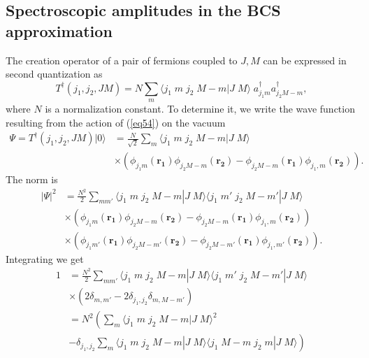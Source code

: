 \begin{subappendices}
\section{Spectroscopic amplitudes in the BCS approximation}\label{C7AppN}
The creation operator of a pair of fermions coupled to $J,M$ can be expressed in second quantization as
\begin{equation}\label{eq54}
T^\dagger(j_1,j_2,J M)=N\sum_m \langle j_1 \; m \;j_2 \;M-m|J \; M\rangle \;a^\dagger_{j_1m}a^\dagger_{j_2M-m},
\end{equation}
where $N$ is a normalization constant. To determine it, we write the wave function resulting from the action of (\ref{eq54}) on the vacuum
\begin{equation}\label{eq55}
\begin{split}
  \Psi=T^\dagger(j_1,j_2,J M) |0\rangle &= \frac{N}{\sqrt 2}\sum_m \langle j_1 \; m \;j_2 \;M-m|J \; M\rangle\\
    & \times\left(\phi_{j_1 m}(\mathbf{r_1})\phi_{j_2 M-m}(\mathbf{r_2})-\phi_{j_2 M-m}(\mathbf{r_1})\phi_{j_1,m}(\mathbf{r_2})\right).
\end{split}
\end{equation}
 The norm is
 \begin{equation}\label{eq56}
\begin{split}
  |\Psi|^2&= \frac{N^2}{2}\sum_{mm'} \langle j_1 \; m \;j_2 \;M-m|J \; M\rangle \langle j_1 \; m' \;j_2 \;M-m'|J \; M\rangle\\
    & \times \left(\phi_{j_1 m}(\mathbf{r_1})\phi_{j_2 M-m}(\mathbf{r_2})-\phi_{j_2 M-m}(\mathbf{r_1})\phi_{j_1,m}(\mathbf{r_2})\right)\\
    &\times \left(\phi_{j_1 m'}(\mathbf{r_1})\phi_{j_2 M-m'}(\mathbf{r_2})-\phi_{j_2 M-m'}(\mathbf{r_1})\phi_{j_1,m'}(\mathbf{r_2})\right).
\end{split}
\end{equation}
Integrating we get
 \begin{equation}\label{eq57}
\begin{split}
  1&= \frac{N^2}{2}\sum_{mm'} \langle j_1 \; m \;j_2 \;M-m|J \; M\rangle \langle j_1 \; m' \;j_2 \;M-m'|J \; M\rangle\\
    & \times \left(2\delta_{m,m'}-2\delta_{j_1,j_2}\delta_{m,M-m'}\right)\\
    &=N^2\left(\sum_m \langle j_1 \; m \;j_2 \;M-m|J \; M\rangle^2\right.\\
    &\left.- \delta_{j_1,j_2}\sum_m \langle j_1 \; m \;j_2 \;M-m|J \; M\rangle \langle j_1 \; M-m \;j_2 \;m|J \; M\rangle\right)\\

\end{split}
\end{equation}
\end{subappendices}
